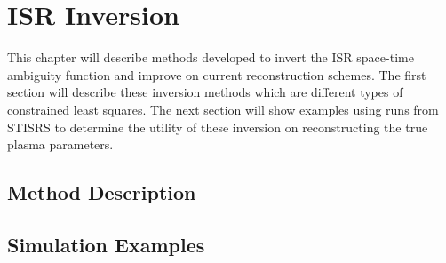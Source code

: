 \chapter{ISR Inversion}
\label{chapter:inversion}
\thispagestyle{myheadings}

\graphicspath{{5_Inversions/Figures/}}

This chapter will describe methods developed to invert the ISR space-time ambiguity function and improve on current reconstruction schemes. The first section will describe these inversion methods which are different types of constrained least squares. The next section will show examples using runs from STISRS to determine the utility of these inversion on reconstructing the true plasma parameters.

\section{Method Description}

\section{Simulation Examples}